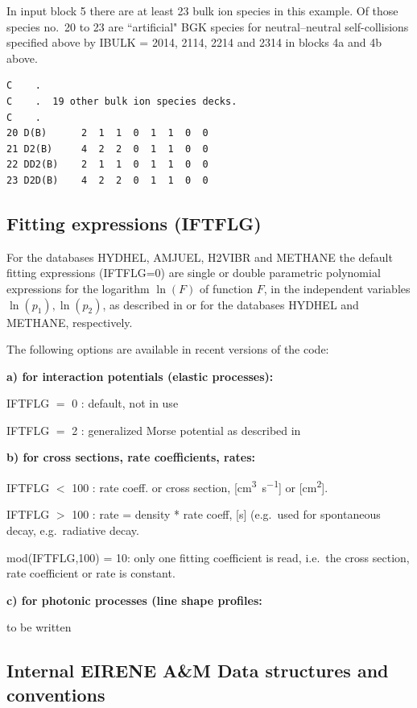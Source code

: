 In input block 5 there are at least 23 bulk ion species in this example.
Of those species no.\ 20 to 23 are ``artificial" \ac{BGK} species for
neutral--neutral self-collisions specified above by IBULK = 2014, 2114, 2214
and 2314 in blocks 4a and 4b above.
\begin{lstlisting}
C    .
C    .  19 other bulk ion species decks.
C    .
20 D(B)      2  1  1  0  1  1  0  0
21 D2(B)     4  2  2  0  1  1  0  0
22 DD2(B)    2  1  1  0  1  1  0  0
23 D2D(B)    4  2  2  0  1  1  0  0
\end{lstlisting}

\subsection{Fitting expressions (IFTFLG)}

For the databases HYDHEL, AMJUEL, H2VIBR and METHANE the default fitting
expressions (IFTFLG=0) are single or double parametric polynomial expressions
for the logarithm $\ln(F)$ of function $F$, in the independent variables
$\ln(p_1), \ln(p_2)$, as described in \cite{kn:Janev} or \cite{kn:Ehrhardt} for
the databases HYDHEL and METHANE, respectively.

The following options are available in recent versions of the code:

\textbf{a) for interaction potentials (elastic processes):} 

IFTFLG $=$ 0	:  default, not in use 

IFTFLG $=$ 2	:  generalized Morse potential as described in
\cite{kn:Bachmann} 

\textbf{b) for cross sections, rate coefficients, rates:} 

IFTFLG $<$ 100	:  rate coeff.
or cross section, [\si{\cubic\centi\metre\per\second}] or
  [\si{\square\centi\metre}].

IFTFLG $>$ 100	:  rate = density * rate coeff,  [\si{\second}] (e.g.\ used for
spontaneous decay, e.g.\ radiative decay.

mod(IFTFLG,100) = 10:  only one fitting coefficient is read, i.e.\ the cross
section,
rate coefficient or rate is constant.

\textbf{c) for photonic processes (line shape profiles:} 

to be written 

\subsection{Internal EIRENE A\&M Data structures and conventions}

